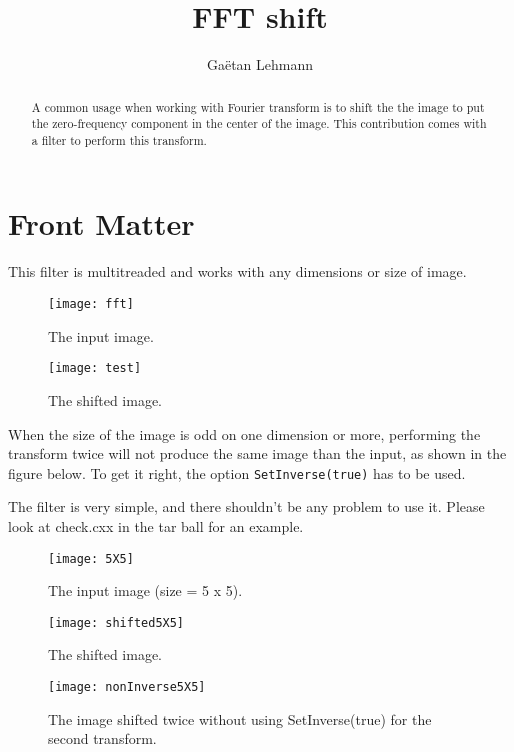 \documentclass{InsightArticle}
\title{FFT shift}
\author{Ga\"etan Lehmann}
\begin{document}
\maketitle

\ifhtml
\chapter*{Front Matter\label{front}}
\fi


\begin{abstract}
\noindent

A common usage when working with Fourier transform is to shift the
the image to put the zero-frequency component in the center of the
image. This contribution comes with a filter to perform this
transform.
\end{abstract}


This filter is multitreaded and works with any dimensions or size of image.

\begin{figure}[htbp]
\centering
\texttt{[image: fft]}
\caption{The input image.}
\end{figure}

\begin{figure}[htbp]
\centering
\texttt{[image: test]}
\caption{The shifted image.}
\end{figure}

When the size of the image is odd on one dimension or more, performing the
transform twice will not produce the same image than the input, as shown in
the figure below. To get it right, the option \verb$SetInverse(true)$ has
to be used.

The filter is very simple, and there shouldn't be any problem to use it. Please
look at check.cxx in the tar ball for an example.

\begin{figure}[htbp]
\centering
\texttt{[image: 5X5]}
\caption{The input image (size = 5 x 5).}
\end{figure}

\begin{figure}[htbp]
\centering
\texttt{[image: shifted5X5]}
\caption{The shifted image.}
\end{figure}

\begin{figure}[htbp]
\centering
\texttt{[image: nonInverse5X5]}
\caption{The image shifted twice without using SetInverse(true) for the second transform.}
\end{figure}

\appendix





\nocite{ITKSoftwareGuide}
\end{document}
